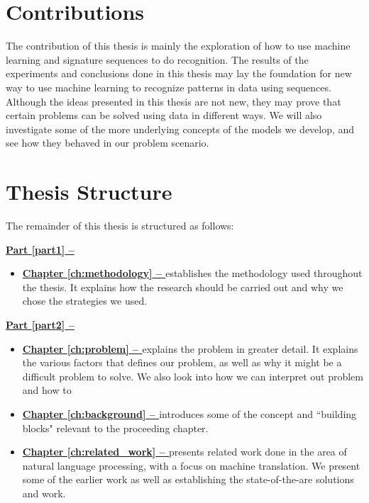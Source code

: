 
\section{Contributions}
\label{sec:contributions}
The contribution of this thesis is mainly the exploration of how to use machine learning and signature sequences to do recognition. The results of the experiments and conclusions done in this thesis may lay the foundation for new way to use machine learning to recognize patterns in data using sequences. Although the ideas presented in this thesis are not new, they may prove that certain problems can be solved using data in different ways. We will also investigate some of the more underlying concepts of the models we develop, and see how they behaved in our problem scenario.


\section{Thesis Structure}
The remainder of this thesis is structured as follows:

\vspace{0.5cm}\noindent
\begin{minipage}{\linewidth}
    \textbf{{\hyperref[part1]{Part \ref{part1} -- }}}
    \begin{itemize}
        \item\textbf{\hyperref[ch:methodology]{Chapter \ref{ch:methodology} -- }} establishes the methodology used throughout the thesis. It explains how the research should be carried out and why we chose the strategies we used.
    \end{itemize}
\end{minipage}

\vspace{0.5cm}\noindent
\begin{minipage}{\linewidth}
    \textbf{{\hyperref[part2]{Part \ref{part2} -- }}}
    \begin{itemize}
        \item\textbf{\hyperref[ch:problem]{Chapter \ref{ch:problem} -- }} explains the problem in greater detail. It explains the various factors that defines our problem, as well as why it might be a difficult problem to solve. We also look into how we can interpret out problem and how to 
        \item\textbf{\hyperref[ch:background]{Chapter \ref{ch:background} -- }} introduces some of the concept and ``building blocks" relevant to the proceeding chapter.
        \item\textbf{\hyperref[ch:related_work]{Chapter \ref{ch:related_work} -- }} presents related work done in the area of natural language processing, with a focus on machine translation. We present some of the earlier work as well as establishing the state-of-the-are solutions and work.
    \end{itemize}
\end{minipage}

